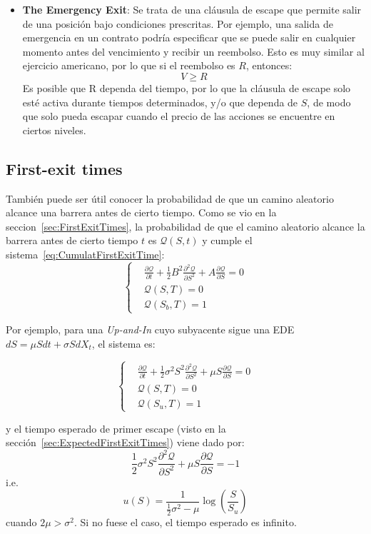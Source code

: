 \begin{itemize}
    \item \textbf{The Emergency Exit}: Se trata de una cláusula de escape que permite salir de una posición bajo condiciones prescritas. Por ejemplo, una salida de emergencia en un contrato podría especificar que se puede salir en cualquier momento antes del vencimiento y recibir un reembolso. Esto es muy similar al ejercicio americano, por lo que si el reembolso es $R$, entonces:
    \[
        V \geq R
    \]
    Es posible que R dependa del tiempo, por lo que la cláusula de escape solo esté activa durante tiempos determinados, y/o que dependa de $S$, de modo que solo pueda escapar cuando el precio de las acciones se encuentre en ciertos niveles.
\end{itemize}





\subsection{First-exit times}
También puede ser útil conocer la probabilidad de que un camino aleatorio alcance una barrera antes de cierto tiempo. Como se vio en la seccion~\ref{sec:FirstExitTimes}, la probabilidad de que el camino aleatorio alcance la barrera antes de cierto tiempo $t$ es $\mathcal{Q}(S,t)$ y cumple el sistema~\eqref{eq:CumulatFirstExitTime}:
\[
    \boxed{
        \left\{
        \begin{aligned}
            &\frac{\partial \mathcal{Q}}{\partial t} + \frac{1}{2} B^2 \frac{\partial^2 \mathcal{Q}}{\partial S^2} + A \frac{\partial \mathcal{Q}}{\partial S} = 0 \\[1.5ex]
            &\mathcal{Q}(S, T) = 0 \\[1.5ex]
            &\mathcal{Q}(S_b, T) = 1
        \end{aligned}
        \right.
    }
\]

Por ejemplo, para una \textit{Up-and-In} cuyo subyacente sigue una EDE $dS = \mu S dt + \sigma S dX_t$, el sistema es:

\[
    \left\{
    \begin{aligned}
        &\frac{\partial \mathcal{Q}}{\partial t} + \frac{1}{2} \sigma^2 S^2 \frac{\partial^2 \mathcal{Q}}{\partial S^2} + \mu S \frac{\partial \mathcal{Q}}{\partial S} = 0 \\[1.5ex]
        &\mathcal{Q}(S, T) = 0 \\[1.5ex]
        &\mathcal{Q}(S_u, T) = 1
    \end{aligned}
    \right.
\]

y el tiempo esperado de primer escape (visto en la sección~\ref{sec:ExpectedFirstExitTimes}) viene dado por:
\[
    \frac{1}{2} \sigma^2 S^2 \frac{\partial^2 \mathcal{Q}}{\partial S^2} + \mu S \frac{\partial \mathcal{Q}}{\partial S} = -1
\]
i.e.
\[
    u(S) = \frac{1}{\frac{1}{2}\sigma^2 - \mu} \log\left( \frac{S}{S_u} \right)
\]
cuando $2\mu > \sigma^2$. Si no fuese el caso, el tiempo esperado es infinito.






